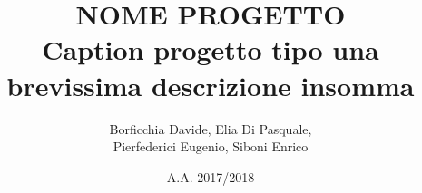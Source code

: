 \title{\textbf{NOME PROGETTO\\Caption progetto tipo una brevissima descrizione insomma}}
\author{Borficchia Davide, \hspace{5pt}Elia Di Pasquale, \\Pierfederici Eugenio, \hspace{5pt}Siboni Enrico}
\date{A.A. 2017/2018}